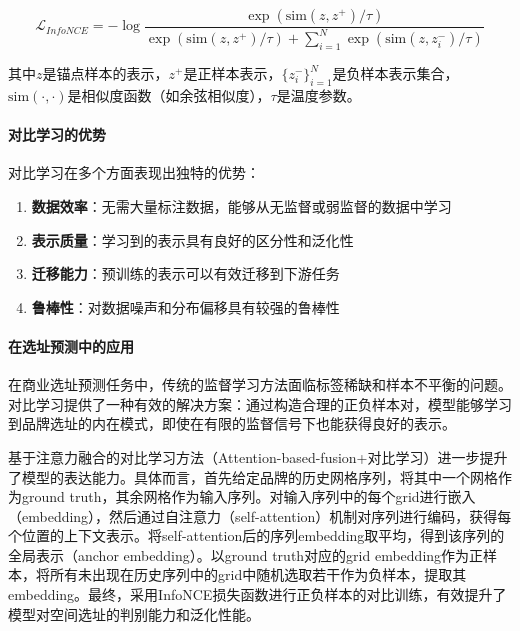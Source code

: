 \documentclass{article}
\begin{document}
\begin{equation}
\mathcal{L}_{InfoNCE} = -\log \frac{\exp(\text{sim}(z, z^+) / \tau)}{\exp(\text{sim}(z, z^+) / \tau) + \sum_{i=1}^{N} \exp(\text{sim}(z, z_i^-) / \tau)}
\end{equation}

其中$z$是锚点样本的表示，$z^+$是正样本表示，$\{z_i^-\}_{i=1}^N$是负样本表示集合，$\text{sim}(\cdot, \cdot)$是相似度函数（如余弦相似度），$\tau$是温度参数。

\paragraph{对比学习的优势}
对比学习在多个方面表现出独特的优势：

\begin{enumerate}
\item \textbf{数据效率}：无需大量标注数据，能够从无监督或弱监督的数据中学习
\item \textbf{表示质量}：学习到的表示具有良好的区分性和泛化性
\item \textbf{迁移能力}：预训练的表示可以有效迁移到下游任务
\item \textbf{鲁棒性}：对数据噪声和分布偏移具有较强的鲁棒性
\end{enumerate}

\paragraph{在选址预测中的应用}
在商业选址预测任务中，传统的监督学习方法面临标签稀缺和样本不平衡的问题。对比学习提供了一种有效的解决方案：通过构造合理的正负样本对，模型能够学习到品牌选址的内在模式，即使在有限的监督信号下也能获得良好的表示。

基于注意力融合的对比学习方法（Attention-based-fusion+对比学习）进一步提升了模型的表达能力。具体而言，首先给定品牌的历史网格序列，将其中一个网格作为ground truth，其余网格作为输入序列。对输入序列中的每个grid进行嵌入（embedding），然后通过自注意力（self-attention）机制对序列进行编码，获得每个位置的上下文表示。将self-attention后的序列embedding取平均，得到该序列的全局表示（anchor embedding）。以ground truth对应的grid embedding作为正样本，将所有未出现在历史序列中的grid中随机选取若干作为负样本，提取其embedding。最终，采用InfoNCE损失函数进行正负样本的对比训练，有效提升了模型对空间选址的判别能力和泛化性能。
\end{document}
